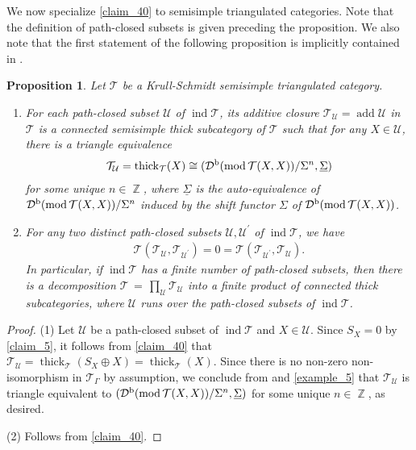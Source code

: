 \documentclass[12pt]{amsart}
\numberwithin{equation}{subsection}
\theoremstyle{plain}
\newtheorem{proposition}[theorem]{Proposition}
\theoremstyle{definition}
\newcommand{\add}{\operatorname{add}}
\renewcommand{\mod}{\mathrm{mod}\,}
\newcommand{\ind}{\operatorname{ind}}
\newcommand{\thick}{\operatorname{thick}}
\newcommand{\Z}{\operatorname{\mathbb{Z}}\nolimits}
\newcommand{\G}{\Gamma}
\newcommand{\T}{\mathcal{T}}
\newcommand{\U}{\mathcal{U}}
\newcommand{\D}{\mathcal{D}}
\begin{document}
We now specialize \cref{claim_40} to semisimple triangulated categories.
Note that the definition of path-closed subsets is given preceding the proposition. 
We also note that the first statement of the following proposition is implicitly contained in \cite[Lemma 4.3]{Chen-Ringel_2018}.




\begin{proposition}\label{claim_37}
Let $\T$ be a Krull-Schmidt semisimple triangulated category.
\begin{enumerate}
\item For each path-closed subset $\U$ of $\ind\T$, its additive closure $\T_\U=\add\U$ in $\T$ is a connected semisimple thick subcategory of $\T$ such that for any $X\in\U$, there is a triangle equivalence
\begin{align}
    \T_\U = \thick_\T(X) \cong (\D^{\rm b}(\mod \T(X, X))/\Sigma^{n}, \underline{\Sigma})
\end{align} 
for some unique $n\in\Z$, where $\underline{\Sigma}$ is the auto-equivalence of $\D^{\rm b}(\mod \T(X, X))/\Sigma^{n}$ induced by the shift functor $\Sigma$ of $\D^{\rm b}(\mod \T(X, X))$.
\item For any two distinct path-closed subsets $\U, \U^\prime$ of $\ind\T$, we have 
\begin{align}
    \T(\T_{\U}, \T_{\U^\prime}) =0= \T(\T_{\U^\prime}, \T_{\U}).
\end{align}
In particular, if $\ind\T$ has a finite number of path-closed subsets, then there is a decomposition $\T\,=\,\prod_{\U}\T_\U$ into a finite product of connected thick subcategories, where $\U$ runs over the path-closed subsets of $\ind\T$.
\end{enumerate}
\end{proposition}
\begin{proof}
(1)
Let $\U$ be a path-closed subset of $\ind\T$ and $X\in\U$.
Since $S_X=0$ by \cref{claim_5}, it follows from \cref{claim_40} that $\T_\U=\thick_\T(S_X\oplus X)=\thick_\T(X)$.
Since there is no non-zero non-isomorphism in $\T_\G$ by assumption, we conclude from \cite[Lemma 4.3]{Chen-Ringel_2018} and \cref{example_5} that $\T_\U$ is triangle equivalent to $(\D^{\rm b}(\mod \T(X, X))/\Sigma^{n}, \underline{\Sigma})$ for some unique $n\in\Z$, as desired.



(2) Follows from \cref{claim_40}.
\end{proof}
\end{document}
